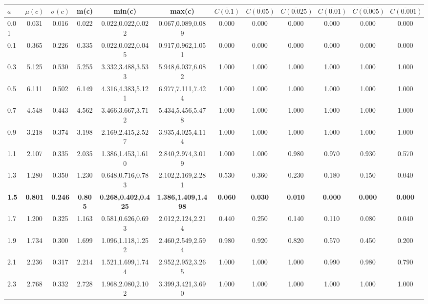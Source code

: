 \begin{table*}[h!]
\begin{center}
\begin{tabular}{| l | c | c | c | c | c | c | c | c | c | c | c |}\hline
$a$ & $\mu(c)$ & $\sigma(c)$ & m(c) & min(c) & max(c) & $\overline{C(0.1)}$ & $\overline{C(0.05)}$ & $\overline{C(0.025)}$ & $\overline{C(0.01)}$ & $\overline{C(0.005)}$ & $\overline{C(0.001)}$ \\\hline\hline
0.01 & 0.031 & 0.016 & 0.022 & 0.022,0.022,0.022 & 0.067,0.089,0.089  & 0.000  & 0.000  & 0.000  & 0.000  & 0.000  & 0.000 \\\hline
0.1 & 0.365 & 0.226 & 0.335 & 0.022,0.022,0.045 & 0.917,0.962,1.051  & 0.000  & 0.000  & 0.000  & 0.000  & 0.000  & 0.000 \\\hline
0.3 & 5.125 & 0.530 & 5.255 & 3.332,3.488,3.533 & 5.948,6.037,6.082  & 1.000  & 1.000  & 1.000  & 1.000  & 1.000  & 1.000 \\\hline
0.5 & 6.111 & 0.502 & 6.149 & 4.316,4.383,5.121 & 6.977,7.111,7.424  & 1.000  & 1.000  & 1.000  & 1.000  & 1.000  & 1.000 \\\hline
0.7 & 4.548 & 0.443 & 4.562 & 3.466,3.667,3.712 & 5.434,5.456,5.478  & 1.000  & 1.000  & 1.000  & 1.000  & 1.000  & 1.000 \\\hline
0.9 & 3.218 & 0.374 & 3.198 & 2.169,2.415,2.527 & 3.935,4.025,4.114  & 1.000  & 1.000  & 1.000  & 1.000  & 1.000  & 1.000 \\\hline
1.1 & 2.107 & 0.335 & 2.035 & 1.386,1.453,1.610 & 2.840,2.974,3.019  & 1.000  & 1.000  & 0.980  & 0.970  & 0.930  & 0.570 \\\hline
1.3 & 1.280 & 0.350 & 1.230 & 0.648,0.716,0.783 & 2.102,2.169,2.281  & 0.530  & 0.360  & 0.230  & 0.180  & 0.150  & 0.040 \\\hline
{\bf 1.5} & {\bf 0.801} & {\bf 0.246} & {\bf 0.805} & {\bf 0.268,0.402,0.425} & {\bf 1.386,1.409,1.498} & {\bf 0.060} & {\bf 0.030} & {\bf 0.010} & {\bf 0.000} & {\bf 0.000} & {\bf 0.000} \\\hline
1.7 & 1.200 & 0.325 & 1.163 & 0.581,0.626,0.693 & 2.012,2.124,2.214  & 0.440  & 0.250  & 0.140  & 0.110  & 0.080  & 0.040 \\\hline
1.9 & 1.734 & 0.300 & 1.699 & 1.096,1.118,1.252 & 2.460,2.549,2.594  & 0.980  & 0.920  & 0.820  & 0.570  & 0.450  & 0.200 \\\hline
2.1 & 2.236 & 0.317 & 2.214 & 1.521,1.699,1.744 & 2.952,2.952,3.265  & 1.000  & 1.000  & 1.000  & 0.990  & 0.980  & 0.790 \\\hline
2.3 & 2.768 & 0.332 & 2.728 & 1.968,2.080,2.102 & 3.399,3.421,3.690  & 1.000  & 1.000  & 1.000  & 1.000  & 1.000  & 1.000 \\\hline

\end{tabular}
\end{center}
\end{table*}
